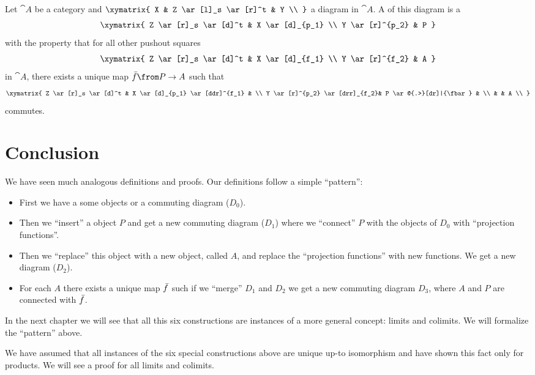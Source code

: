 \begin{definition}[Pushout]
  \label{def:pushout}
  Let $\cat{A}$ be a category and
  $ \xymatrix{
    X & Z \ar[l]_s \ar[r]^t & Y \\
  } $
  a diagram in $\cat{A}$.
  A  of this diagram is a  \\
  \[ \xymatrix{
    Z \ar[r]_s \ar[d]^t & X \ar[d]_{p_1} \\
    Y \ar[r]^{p_2} & P
  } \]
  with the property that for all other pushout squares
  \[ \xymatrix{
    Z \ar[r]_s \ar[d]^t & X \ar[d]_{f_1} \\
    Y \ar[r]^{f_2} & A
  } \]
  in $\cat{A}$, there exists a unique map $\fbar\from P \to A$ such that
  \[ \xymatrix{
    Z \ar[r]_s \ar[d]^t & X \ar[d]_{p_1} \ar[ddr]^{f_1} & \\
    Y \ar[r]^{p_2} \ar[drr]_{f_2}& P \ar@{.>}[dr]|{\fbar} & \\
    & & A  \\
  } \]
  commutes.
\end{definition}


\section*{Conclusion}
We have seen much analogous definitions and proofs.
Our definitions follow a simple ``pattern'':
\begin{itemize}
  \item First we have a some objects or a commuting diagram ($D_0$).
  \item Then we ``insert'' a object $P$ and get a new commuting diagram ($D_1$) where we ``connect'' $P$ with the objects of $D_0$ with ``projection functions''.
  \item Then we ``replace'' this object with a new object, called $A$, and replace the ``projection functions'' with new functions. We get a new diagram ($D_2$).
  \item For each $A$ there exists a unique map $\bar{f}$ such if we ``merge'' $D_1$ and $D_2$ we get a new commuting diagram $D_3$, where $A$ and $P$ are connected with $\bar{f}$.
\end{itemize}

In the next chapter we will see that all this six constructions are instances of a more general concept: limits and colimits.
We will formalize the ``pattern'' above.

We have assumed that all instances of the six special constructions above are unique up-to isomorphism
and have shown this fact only for products. We will see a proof for all limits and colimits.



